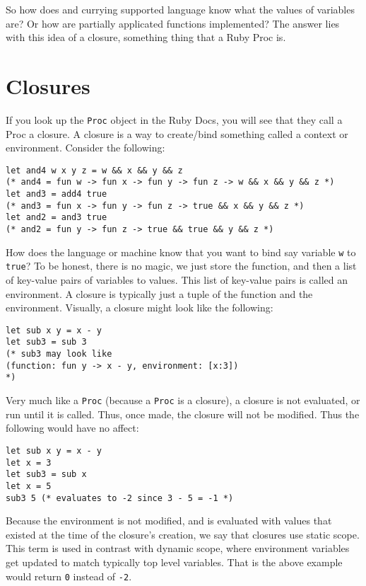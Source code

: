 \documentclass[main.tex]{subfiles}
\begin{document}
So how does and currying supported language know what the values of variables are? Or how are partially applicated functions implemented? 
The answer lies with this idea of a closure, something thing that a Ruby Proc is. 

\section{Closures}
If you look up the \texttt{Proc} object in the Ruby Docs, you will see that they call a Proc a closure. A closure is a way to create/bind something called a context or environment. Consider the following:
\begin{lstlisting}
let and4 w x y z = w && x && y && z
(* and4 = fun w -> fun x -> fun y -> fun z -> w && x && y && z *)
let and3 = add4 true
(* and3 = fun x -> fun y -> fun z -> true && x && y && z *)
let and2 = and3 true
(* and2 = fun y -> fun z -> true && true && y && z *)
\end{lstlisting}
How does the language or machine know that you want to bind say variable \texttt{w} to \texttt{true}?
To be honest, there is no magic, we just store the function, and then a list of key-value pairs of variables to values. This list of key-value pairs is called an environment. A closure is typically just a tuple of the function and the environment. 
Visually, a closure might look like the following:
\begin{lstlisting}
let sub x y = x - y
let sub3 = sub 3
(* sub3 may look like 
(function: fun y -> x - y, environment: [x:3])
*)
\end{lstlisting}
Very much like a \texttt{Proc} (because a \texttt{Proc} is a closure), a closure is not evaluated, or run until it is called. Thus, once made, the closure will not be modified. Thus the following would have no affect:
\begin{lstlisting}[style=Myocamlstyle]
let sub x y = x - y
let x = 3
let sub3 = sub x
let x = 5
sub3 5 (* evaluates to -2 since 3 - 5 = -1 *)
\end{lstlisting}
Because the environment is not modified, and is evaluated with values that existed at the time of the closure's creation, we say that closures use static scope. This term is used in contrast with dynamic scope, where environment variables get updated to match typically top level variables. 
That is the above example would return \texttt{0} instead of \texttt{-2}. 
\end{document}
